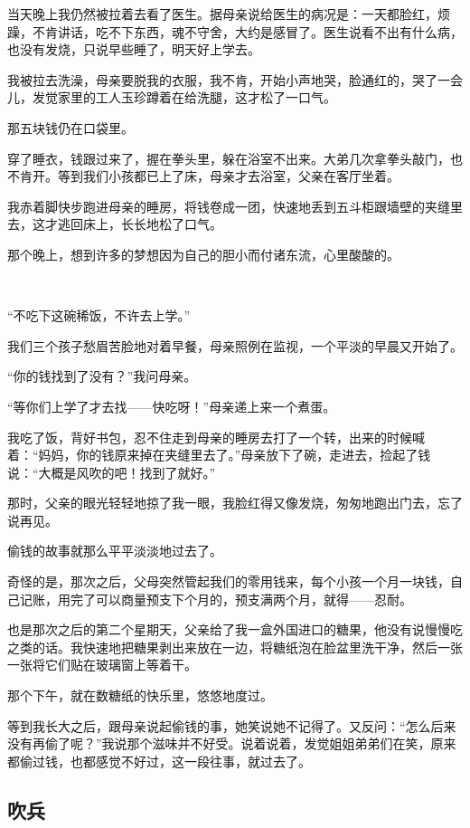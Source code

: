 \par 当天晚上我仍然被拉着去看了医生。据母亲说给医生的病况是：一天都脸红，烦躁，不肯讲话，吃不下东西，魂不守舍，大约是感冒了。医生说看不出有什么病，也没有发烧，只说早些睡了，明天好上学去。
\par 我被拉去洗澡，母亲要脱我的衣服，我不肯，开始小声地哭，脸通红的，哭了一会儿，发觉家里的工人玉珍蹲着在给洗腿，这才松了一口气。
\par 那五块钱仍在口袋里。
\par 穿了睡衣，钱跟过来了，握在拳头里，躲在浴室不出来。大弟几次拿拳头敲门，也不肯开。等到我们小孩都已上了床，母亲才去浴室，父亲在客厅坐着。
\par 我赤着脚快步跑进母亲的睡房，将钱卷成一团，快速地丢到五斗柜跟墙壁的夹缝里去，这才逃回床上，长长地松了口气。
\par 那个晚上，想到许多的梦想因为自己的胆小而付诸东流，心里酸酸的。
\par  
\par “不吃下这碗稀饭，不许去上学。”
\par 我们三个孩子愁眉苦脸地对着早餐，母亲照例在监视，一个平淡的早晨又开始了。
\par “你的钱找到了没有？”我问母亲。
\par “等你们上学了才去找——快吃呀！”母亲递上来一个煮蛋。
\par 我吃了饭，背好书包，忍不住走到母亲的睡房去打了一个转，出来的时候喊着：“妈妈，你的钱原来掉在夹缝里去了。”母亲放下了碗，走进去，捡起了钱说：“大概是风吹的吧！找到了就好。”
\par 那时，父亲的眼光轻轻地掠了我一眼，我脸红得又像发烧，匆匆地跑出门去，忘了说再见。
\par 偷钱的故事就那么平平淡淡地过去了。
\par 奇怪的是，那次之后，父母突然管起我们的零用钱来，每个小孩一个月一块钱，自己记账，用完了可以商量预支下个月的，预支满两个月，就得——忍耐。
\par 也是那次之后的第二个星期天，父亲给了我一盒外国进口的糖果，他没有说慢慢吃之类的话。我快速地把糖果剥出来放在一边，将糖纸泡在脸盆里洗干净，然后一张一张将它们贴在玻璃窗上等着干。
\par 那个下午，就在数糖纸的快乐里，悠悠地度过。
\par 等到我长大之后，跟母亲说起偷钱的事，她笑说她不记得了。又反问：“怎么后来没有再偷了呢？”我说那个滋味并不好受。说着说着，发觉姐姐弟弟们在笑，原来都偷过钱，也都感觉不好过，这一段往事，就过去了。




\subsection{吹兵}



